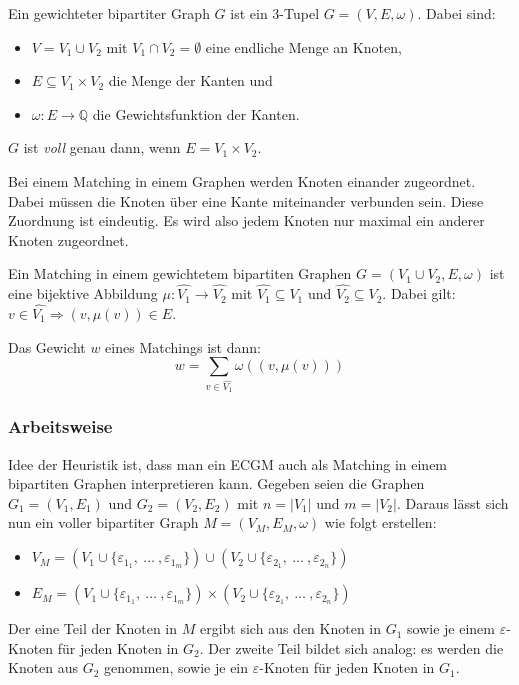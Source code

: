 \begin{mydef}
Ein gewichteter bipartiter Graph $G$ ist ein 3-Tupel $G=(V,E,\omega)$. Dabei sind:
\begin{itemize}
	\item $V=V_1 \cup V_2$ mit $V_1 \cap V_2=\emptyset$ eine endliche Menge an Knoten,
	\item $E \subseteq V_1 \times V_2$ die Menge der Kanten und
	\item $\omega:E \rightarrow \mathbb{Q}$ die Gewichtsfunktion der Kanten.
\end{itemize}
$G$ ist \emph{voll} genau dann, wenn $E=V_1\times V_2$.
\end{mydef}

Bei einem Matching in einem Graphen werden Knoten einander zugeordnet. Dabei müssen 
die Knoten über eine Kante miteinander verbunden sein. Diese Zuordnung ist eindeutig. 
Es wird also jedem Knoten nur maximal ein anderer Knoten zugeordnet.

\begin{mydef}[Matching]
Ein Matching in einem gewichtetem bipartiten Graphen $G=(V_1 \cup V_2,E,\omega)$ ist eine bijektive
Abbildung $\mu:\hat{V_1} \rightarrow \hat{V_2}$ mit $\hat{V_1} \subseteq V_1$ und $\hat{V_2}
 \subseteq V_2$. Dabei gilt: $v \in \hat{V_1} \Rightarrow (v,\mu(v)) \in E$.
\end{mydef}

Das Gewicht $w$ eines Matchings ist dann: 
\[ w=\sum_{v \in \hat{V_1}} \omega((v,\mu(v)))  \]

\subsubsection{Arbeitsweise}
Idee der Heuristik ist, dass man ein ECGM auch als Matching in einem bipartiten Graphen
interpretieren kann. Gegeben seien die Graphen $G_1=(V_1,E_1)$ und $G_2=(V_2,E_2)$
mit $n=|V_1|$ und $m=|V_2|$. Daraus lässt sich nun
ein voller bipartiter Graph $M=(V_M,E_M,\omega)$ wie folgt erstellen:
\begin{itemize}
	\item $V_M=(V_1 \cup \{\varepsilon_{1_1},\ \ldots\ , \varepsilon_{1_m}\}) \cup
	           (V_2 \cup \{\varepsilon_{2_1},\ \ldots\ , \varepsilon_{2_n}\})$
	\item $E_M=(V_1 \cup \{\varepsilon_{1_1},\ \ldots\ , \varepsilon_{1_m}\}) \times
	           (V_2 \cup \{\varepsilon_{2_1},\ \ldots\ , \varepsilon_{2_n}\})$
\end{itemize}
Der eine Teil der Knoten in $M$ ergibt sich aus den Knoten in $G_1$ sowie 
je einem $\varepsilon$-Knoten für jeden Knoten in $G_2$. Der zweite Teil 
bildet sich analog: es werden die Knoten aus $G_2$ genommen, sowie je ein 
$\varepsilon$-Knoten für jeden Knoten in $G_1$.

